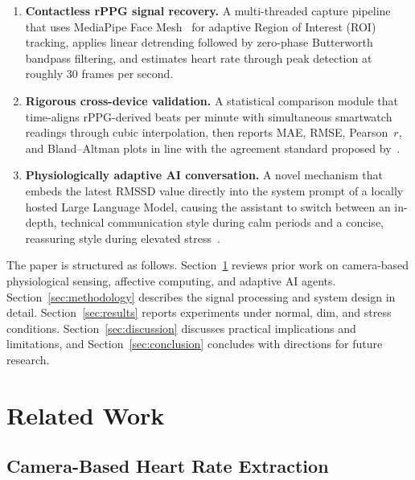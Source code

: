 \documentclass[conference]{IEEEtran}
\begin{document}
\begin{enumerate}
  \item \textbf{Contactless rPPG signal recovery.} A multi-threaded
        capture pipeline that uses MediaPipe Face
        Mesh~\cite{lugaresi2019mediapipe} for adaptive Region of
        Interest (ROI) tracking, applies linear detrending followed
        by zero-phase Butterworth bandpass filtering, and estimates
        heart rate through peak detection at roughly 30 frames per
        second.

  \item \textbf{Rigorous cross-device validation.} A statistical
        comparison module that time-aligns rPPG-derived beats per
        minute with simultaneous smartwatch readings through cubic
        interpolation, then reports MAE, RMSE, Pearson~$r$, and
        Bland--Altman plots in line with the agreement standard
        proposed by~\cite{bland1986statistical}.

  \item \textbf{Physiologically adaptive AI conversation.} A novel
        mechanism that embeds the latest RMSSD value directly into
        the system prompt of a locally hosted Large Language Model,
        causing the assistant to switch between an in-depth, technical
        communication style during calm periods and a concise,
        reassuring style during elevated
        stress~\cite{picard2001affective, lee2024humanai}.
\end{enumerate}

The paper is structured as follows. Section~\ref{sec:related}
reviews prior work on camera-based physiological sensing, affective
computing, and adaptive AI agents. Section~\ref{sec:methodology}
describes the signal processing and system design in detail.
Section~\ref{sec:results} reports experiments under normal, dim,
and stress conditions. Section~\ref{sec:discussion} discusses
practical implications and limitations, and
Section~\ref{sec:conclusion} concludes with directions for
future research.


\section{Related Work}
\label{sec:related}

\subsection{Camera-Based Heart Rate Extraction}
\end{document}
